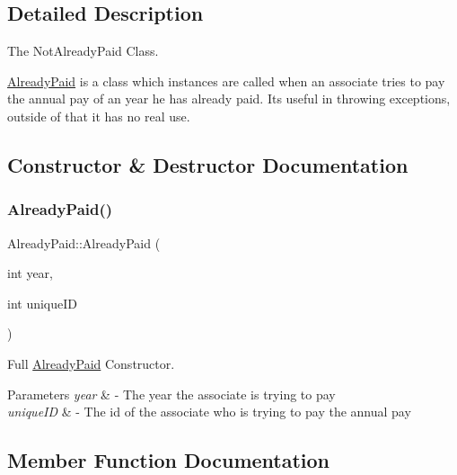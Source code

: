 \subsection{Detailed Description}
The Not\+Already\+Paid Class. 

\hyperlink{classAlreadyPaid}{Already\+Paid} is a class which instances are called when an associate tries to pay the annual pay of an year he has already paid. Its useful in throwing exceptions, outside of that it has no real use. 

\subsection{Constructor \& Destructor Documentation}
\mbox{\label{classAlreadyPaid_afa3ccdeb73e3570b346a4938a836a44e}} 
\subsubsection{\texorpdfstring{Already\+Paid()}{AlreadyPaid()}}
{\footnotesize\ttfamily Already\+Paid\+::\+Already\+Paid (\begin{DoxyParamCaption}\item[{int}]{year,  }\item[{int}]{unique\+ID }\end{DoxyParamCaption})\hspace{0.3cm}{\ttfamily [inline]}}



Full \hyperlink{classAlreadyPaid}{Already\+Paid} Constructor. 


\begin{DoxyParams}{Parameters}
{\em year} & -\/ The year the associate is trying to pay \\
\hline
{\em unique\+ID} & -\/ The id of the associate who is trying to pay the annual pay \\
\hline
\end{DoxyParams}


\subsection{Member Function Documentation}
\mbox{\label{classAlreadyPaid_a54d1869f925f98bb8621131debf5f2c8}} 
